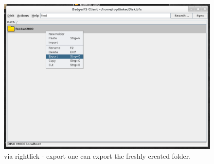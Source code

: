 \begin{figure}[h!]
\centering
\includegraphics[width=1\textwidth]{figures/serverUseCase/13_export.png}
\caption{ via rightlick - export one can export the freshly created folder.}
\label{fig:13_export.png}
\end{figure}